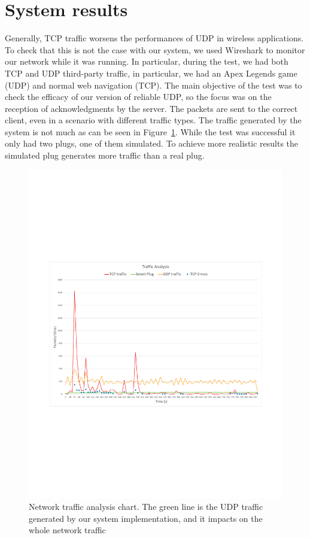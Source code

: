 \documentclass[conference]{IEEEtran}
\begin{document}
	\section{System results}
	Generally, TCP traffic worsens the performances of UDP in wireless applications. To check that this is not the case with our system,
	we used Wireshark to monitor our network while it was running. In particular, during the test, we had both TCP and UDP third-party traffic, in particular, we had an Apex Legends game (UDP) and normal web navigation (TCP). The main objective of the test was to check the efficacy of our version of reliable UDP, so the focus was on the reception of acknowledgments by the server. The packets are sent to the correct client, even in a scenario with different traffic types. The traffic generated by the system is not much as can be seen in Figure~\ref{fig:grafico}. While the test was successful it only had two plugs, one of them simulated. To achieve more realistic results the simulated plug generates more traffic than a real plug. 

	\begin{figure}[htbp]
		\centering
		\includegraphics[width=\linewidth]{assets/grafico}
		\caption{Network traffic analysis chart. The green line is the UDP  traffic generated by our system implementation, and it impacts on the whole network traffic}
		\label{fig:grafico}
	\end{figure}
	
\end{document}
